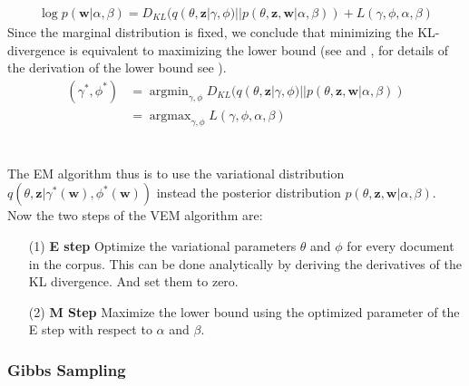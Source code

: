 \documentclass[11pt,a4paper]{article}
\DeclareMathOperator*{\argmin}{argmin}
\DeclareMathOperator*{\argmax}{argmax}
\begin{document}
\begin{align}\label{equality}
\log p(\textbf{w}|\alpha, \beta)= D_{KL}(q(\theta,\textbf{z}|\gamma,\phi)||p(\theta,\textbf{z},\textbf{w}|\alpha,\beta)) + L(\gamma,\phi,\alpha, \beta)
\end{align}
Since the marginal distribution is fixed, we conclude that minimizing the KL-divergence is equivalent to maximizing the lower bound (see \cite{Jordan1999} and \cite{Wainwright2008}, for details of the derivation of the lower bound see \cite{Blei2003}).
\begin{align}
(\gamma^*, \phi^*) &= \argmin_{\gamma, \phi}D_{KL}(q(\theta,\textbf{z}|\gamma,\phi)||p(\theta,\textbf{z},\textbf{w}|\alpha,\beta))\\
&= \argmax_{\gamma, \phi} L(\gamma,\phi,\alpha, \beta)
\end{align}\\
\\
The EM algorithm thus is to use the variational distribution $q(\theta,\textbf{z}|\gamma^*(\textbf{w}), \phi^*(\textbf{w}))$ instead the posterior distribution $p(\theta,\textbf{z},\textbf{w}|\alpha,\beta)$. Now the two steps of the VEM algorithm are:
\begin{itemize}
	\item [(1)]\textbf{E step} Optimize the variational parameters $\theta$ and $\phi$ for every document in the corpus. This can be done analytically by deriving the derivatives of the KL divergence. And set them to zero.
	\item [(2)] \textbf{M Step} Maximize the lower bound using the optimized parameter of the E step with respect to $\alpha$ and $\beta$.
\end{itemize}


\subsubsection{Gibbs Sampling}
\end{document}
